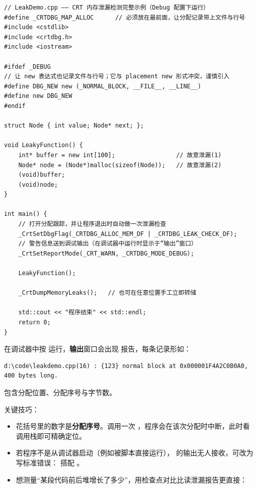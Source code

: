 \begin{lstlisting}[style=cppstyle]
// LeakDemo.cpp —— CRT 内存泄漏检测完整示例（Debug 配置下运行）
#define _CRTDBG_MAP_ALLOC      // 必须放在最前面，让分配记录带上文件与行号
#include <cstdlib>
#include <crtdbg.h>
#include <iostream>

#ifdef _DEBUG
// 让 new 表达式也记录文件与行号；它与 placement new 形式冲突，谨慎引入
#define DBG_NEW new (_NORMAL_BLOCK, __FILE__, __LINE__)
#define new DBG_NEW
#endif

struct Node { int value; Node* next; };

void LeakyFunction() {
    int* buffer = new int[100];                 // 故意泄漏(1)
    Node* node = (Node*)malloc(sizeof(Node));   // 故意泄漏(2)
    (void)buffer;
    (void)node;
}

int main() {
    // 打开分配跟踪，并让程序退出时自动做一次泄漏检查
    _CrtSetDbgFlag(_CRTDBG_ALLOC_MEM_DF | _CRTDBG_LEAK_CHECK_DF);
    // 警告信息送到调试输出（在调试器中运行时显示于“输出”窗口）
    _CrtSetReportMode(_CRT_WARN, _CRTDBG_MODE_DEBUG);

    LeakyFunction();

    _CrtDumpMemoryLeaks();   // 也可在任意位置手工立即转储

    std::cout << "程序结束" << std::endl;
    return 0;
}
\end{lstlisting}

在调试器中按  运行，\textbf{输出}窗口会出现  报告，每条记录形如：

\begin{lstlisting}[style=textstyle]
d:\code\leakdemo.cpp(16) : {123} normal block at 0x000001F4A2C0B0A0, 400 bytes long.
\end{lstlisting}

包含分配位置、分配序号与字节数。

关键技巧：

\begin{itemize}
  \item 花括号里的数字是\textbf{分配序号}。调用一次 ，程序会在该次分配时中断，此时看调用栈即可精确定位。
  \item 若程序不是从调试器启动（例如被脚本直接运行）， 的输出无人接收，可改为写标准错误： 搭配 。
  \item 想测量“某段代码前后堆增长了多少”，用检查点对比比读泄漏报告更直接：
\end{itemize}

